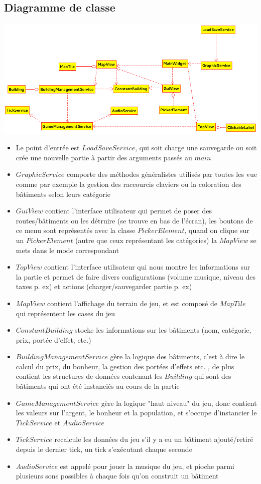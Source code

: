 \documentclass[a4paper,10pt,openany,oneside]{report}
\begin{document}
\subsection{Diagramme de classe}
\includegraphics[width=\textwidth]{img/hierarchieClasses.png}
\begin{itemize}
\item Le point d'entrée est $LoadSaveService$, qui soit charge une sauvegarde ou soit crée une nouvelle partie à partir des arguments passés au $main$
\item $GraphicService$ comporte des méthodes généralistes utilisés par toutes les vue comme par exemple la gestion des raccourcis claviers ou la coloration des bâtiments selon leurs catégorie
\item $GuiView$ contient l'interface utilisateur qui permet de poser des routes/bâtiments ou les détruire (se trouve en bas de l'écran), les boutons de ce menu sont représentés avec la classe $PickerElement$, quand on clique sur un $PickerElement$ (autre que ceux représentant les catégories) la $MapView$ se mets dans le mode correspondant
\item $TopView$ contient l'interface utilisateur qui nous montre les informations sur la partie et permet de faire divers configurations (volume musique, niveau des taxes p. ex) et actions  (charger/sauvegarder partie p. ex)
\item $MapView$ contient l'affichage du terrain de jeu, et est composé de $MapTile$ qui représentent les cases du jeu
\item $ConstantBuilding$ stocke les informations sur les bâtiments (nom, catégorie, prix, portée d'effet, etc.)
\item $BuildingManagementService$ gère la logique des bâtiments, c'est à dire le calcul du prix, du bonheur, la gestion des portées d'effets etc. , de plus contient les structures de données contenant les $Building$ qui sont des bâtiments qui ont été instanciés au cours de la partie
\item $GameManagementService$ gère la logique "haut niveau" du jeu, donc contient les valeurs sur l'argent, le bonheur et la population, et s'occupe d'instancier le $TickService$ et $AudioService$
\item $TickService$ recalcule les données du jeu s'il y a eu un bâtiment ajouté/retiré depuis le dernier tick, un tick s’exécutant chaque seconde
\item $AudioService$ est appelé pour jouer la musique du jeu, et pioche parmi plusieurs sons possibles à chaque fois qu'on construit un bâtiment
\end{itemize}
\end{document}
